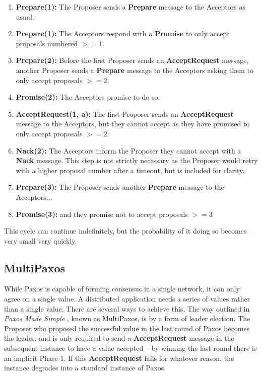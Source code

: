 \documentclass[12pt,twoside,notitlepage]{report}
\newcommand{\msg}[1] {{\bf #1}}         %
\begin{document}
\begin{enumerate}
\item \msg{Prepare(1):} The Proposer sends a \msg{Prepare} message to the Acceptors as usual.
\item \msg{Prepare(1):} The Acceptors respond with a \msg{Promise} to only accept proposals
	numbered $>= 1$.
\item \msg{Prepare(2):} Before the first Proposer sends an \msg{AcceptRequest} message, another
	Proposer sends a \msg{Prepare} message to the Acceptors asking them to only accept
	proposals $>= 2$.
\item \msg{Promise(2):} The Acceptors promise to do so.
\item \msg{AcceptRequest(1, a):} The first Proposer sends an \msg{AcceptRequest} message to the
	Acceptors, but they cannot accept as they have promised to only accept proposals $>= 2$.
\item \msg{Nack(2):} The Acceptors inform the Proposer they cannot accept with a \msg{Nack}
	message. This step is not strictly necessary as the Proposer would retry with a higher
	proposal number after a timeout, but is included for clarity.
\item \msg{Prepare(3):} The Proposer sends another \msg{Prepare} message to the Acceptors...
\item \msg{Promise(3):} and they promise not to accept proposals $>= 3$
\end{enumerate}

This cycle can continue indefinitely, but the probability of it doing so becomes very small very
quickly.

\subsection{MultiPaxos}

While Paxos is capable of forming consensus in a single network, it can only agree on a single
value. A distributed application needs a series of values rather than a single value. There are
several ways to achieve this. The way outlined in \emph{Paxos Made Simple} \cite{lamport01}, known
as MultiPaxos, is by a form of leader election. The Proposer who proposed the successful value in
the last round of Paxos becomes the leader, and is only required to send a \msg{AcceptRequest}
message in the subsequent instance to have a value accepted -- by winning the last round there is
an implicit Phase 1. If this \msg{AcceptRequest} fails for whatever reason, the instance degrades
into a standard instance of Paxos.
\end{document}
